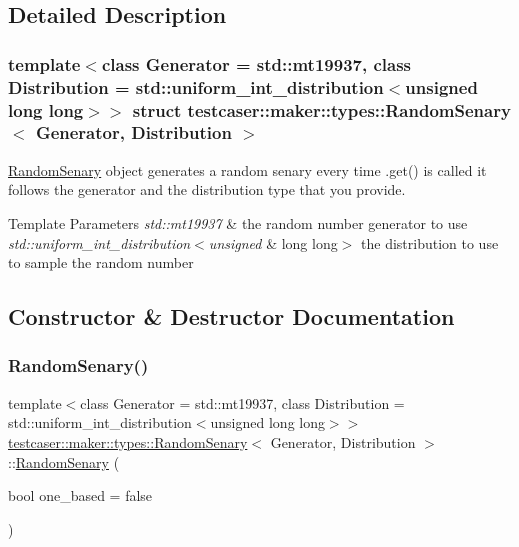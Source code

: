 \subsection{Detailed Description}
\subsubsection*{template$<$class Generator = std\+::mt19937, class Distribution = std\+::uniform\+\_\+int\+\_\+distribution$<$unsigned long long$>$$>$\newline
struct testcaser\+::maker\+::types\+::\+Random\+Senary$<$ Generator, Distribution $>$}

\hyperlink{structtestcaser_1_1maker_1_1types_1_1RandomSenary}{Random\+Senary} object generates a random senary every time .get() is called it follows the generator and the distribution type that you provide. 


\begin{DoxyTemplParams}{Template Parameters}
{\em std\+::mt19937} & the random number generator to use \\
\hline
{\em std\+::uniform\+\_\+int\+\_\+distribution$<$unsigned} & long long$>$ the distribution to use to sample the random number \\
\hline
\end{DoxyTemplParams}


\subsection{Constructor \& Destructor Documentation}
\mbox{\label{structtestcaser_1_1maker_1_1types_1_1RandomSenary_af9340dfac6a22f2b8dd953774ed1cf9d}} 
\subsubsection{\texorpdfstring{Random\+Senary()}{RandomSenary()}}
{\footnotesize\ttfamily template$<$class Generator = std\+::mt19937, class Distribution = std\+::uniform\+\_\+int\+\_\+distribution$<$unsigned long long$>$$>$ \\
\hyperlink{structtestcaser_1_1maker_1_1types_1_1RandomSenary}{testcaser\+::maker\+::types\+::\+Random\+Senary}$<$ Generator, Distribution $>$\+::\hyperlink{structtestcaser_1_1maker_1_1types_1_1RandomSenary}{Random\+Senary} (\begin{DoxyParamCaption}\item[{bool}]{one\+\_\+based = {\ttfamily false} }\end{DoxyParamCaption})\hspace{0.3cm}{\ttfamily [inline]}}




